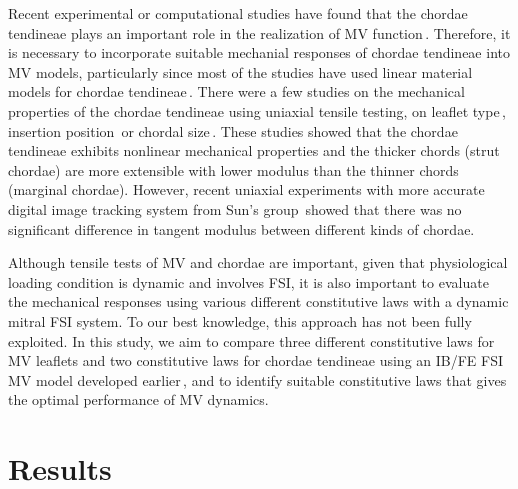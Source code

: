 \documentclass[fleqn,10pt]{wlscirep}
\begin{document}
Recent experimental or computational studies have found that the chordae tendineae plays an important role in the realization of MV function\,\cite{Yin2010Effects,Meschini2018Effects,Casado2012Determination,Toma2016Fluid}. Therefore, it is necessary to incorporate suitable mechanial responses of chordae tendineae into MV models, particularly since most of the studies have used linear material models for chordae tendineae\,\cite{Kunzelman1993,Lau2010,Zhong2014}. 
There were a few studies on the mechanical properties of the chordae tendineae using uniaxial tensile testing,  on leaflet type\,\cite{Zuo2016Characterization}, insertion position\,\cite{RITCHIE2005189} or chordal size\,\cite{LIAO20031125}. These studies showed that the chordae tendineae exhibits nonlinear mechanical properties and the thicker chords (strut chordae) are more extensible with lower modulus than the thinner chords (marginal chordae). However, recent uniaxial experiments with more accurate digital image tracking system from Sun's group\,\cite{Zuo2016Characterization,POKUTTAPASKALEVA2019241} showed that there was no significant difference in tangent modulus between different kinds of chordae. 

Although tensile tests of MV and chordae are  important,  given that physiological loading condition is dynamic and  involves FSI, it is also important to evaluate the mechanical responses using various different constitutive laws with a dynamic mitral FSI system.  To our best knowledge, this approach   has not been fully exploited. In this study, we aim to compare three different  constitutive laws for MV leaflets and two constitutive laws for chordae tendineae using an IB/FE FSI MV model developed earlier\,\cite{Hao2014A}, and to identify suitable constitutive laws that gives the optimal performance of MV dynamics. 


\section*{Results}
\end{document}
